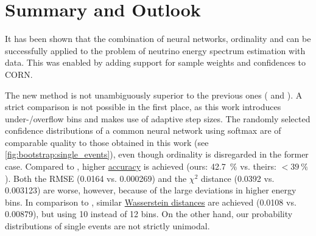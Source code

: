 \chapter{Summary and Outlook} \label{sec:summary}

It has been shown that
the combination of neural networks, ordinality and \dsea{}
  can be successfully applied to
  the problem of neutrino energy spectrum estimation
  with \icecube{} data.
This was enabled by
  adding support for
    sample weights
    and confidences
  to \ac{CORN}.

The new method is not unambiguously superior to the previous ones
  (\cite{dsea_jan} and \cite{dsea_samuel}).
A strict comparison is not possible
    in the first place,
  as this work introduces under-/overflow bins
  and makes use of adaptive step sizes.
The randomly selected confidence distributions of a common neural network using softmax \cite{dsea_samuel}
  are of comparable quality to those obtained in this work (see \autoref{fig:bootstrap:single_events}),
    even though ordinality is disregarded in the former case.
%
Compared to \cite{dsea_samuel},
  higher \hyperref[sec:unfolding:metrics:accuracy]{accuracy} is achieved
    (ours: \SI{42.7}{\percent} vs. theirs: $< \SI{39}{\percent}$).
Both the \ac{RMSE}
  (\num{0.0164} vs. \num{0.000269})
and the $\chi^2$ distance
  (\num{0.0392} vs. \num{0.003123})
are worse,
  however,
because of the large deviations in higher energy bins.
%
In comparison to \cite{dsea_jan},
  similar \hyperref[sec:unfolding:metrics:wd]{Wasserstein distances} are achieved
    (\num{0.0108} vs. \num{0.00879}),
    but using \num{10} instead of \num{12} bins.
On the other hand,
our probability distributions of single events are not strictly unimodal.


